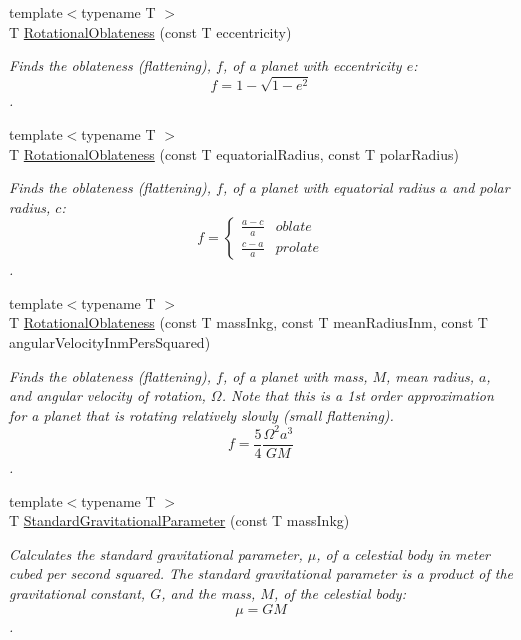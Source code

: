 \begin{DoxyCompactItemize}
{\footnotesize template$<$typename T $>$ }\\T \mbox{\hyperlink{group___e_g_x_phys-_astrophysics-_rotational_flattening_ga494ad3b296185bf65ccf3e2ddebc189a}{Rotational\+Oblateness}} (const T eccentricity)
\begin{DoxyCompactList}\small\item\em Finds the oblateness (flattening), $f$, of a planet with eccentricity $e$\+: \[ f = 1 - \sqrt{1-e^2} \]. \end{DoxyCompactList}\item 
{\footnotesize template$<$typename T $>$ }\\T \mbox{\hyperlink{group___e_g_x_phys-_astrophysics-_rotational_flattening_ga0bbe606845430e58be5ed34541835f83}{Rotational\+Oblateness}} (const T equatorial\+Radius, const T polar\+Radius)
\begin{DoxyCompactList}\small\item\em Finds the oblateness (flattening), $f$, of a planet with equatorial radius $a$ and polar radius, $c$\+: \[ f =\begin{cases} \frac{a-c}{a}{} & oblate \\ \frac{c-a}{a} & prolate \end{cases} \]. \end{DoxyCompactList}\item 
{\footnotesize template$<$typename T $>$ }\\T \mbox{\hyperlink{group___e_g_x_phys-_astrophysics-_rotational_flattening_ga7d78d01c8b3e1a9b2e4f17cb67969a88}{Rotational\+Oblateness}} (const T mass\+Inkg, const T mean\+Radius\+Inm, const T angular\+Velocity\+Inm\+Pers\+Squared)
\begin{DoxyCompactList}\small\item\em Finds the oblateness (flattening), $f$, of a planet with mass, $M$, mean radius, $a$, and angular velocity of rotation, $\Omega$. Note that this is a 1st order approximation for a planet that is rotating relatively slowly (small flattening). \[ f = \frac{5}{4} \frac{\Omega^2 a^3}{GM} \]. \end{DoxyCompactList}\item 
{\footnotesize template$<$typename T $>$ }\\T \mbox{\hyperlink{group___e_g_x_phys-_astrophysics-_standard_gravitational_parameter_ga37f4ed78b0fc23603b49ade3e435ea20}{Standard\+Gravitational\+Parameter}} (const T mass\+Inkg)
\begin{DoxyCompactList}\small\item\em Calculates the standard gravitational parameter, $\mu$, of a celestial body in meter cubed per second squared. The standard gravitational parameter is a product of the gravitational constant, $G$, and the mass, $M$, of the celestial body\+: \[\mu = GM\]. \end{DoxyCompactList}\item 

\end{DoxyCompactItemize}
